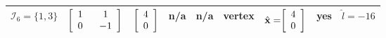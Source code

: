 \documentclass{imaman}
\newcommand{\bfx}{{\bf x}}
\newcommand{\calI}{{\mathcal I}}
\numberwithin{equation}{section}
\begin{document}
\begin{landscape}
\begin{table}[htbp]
\begin{threeparttable}[tbhp]
\begin{tabular}{l l l l l l l l l}
$\calI_6=\{1,3\}$ & \hspace{-0.1cm}$\left[ \renewcommand{\arraystretch}{1} \begin{array}{cc} 1 & ~~1 \\ 0 & ~~{-1} \end{array}\right]$ & \hspace{-0.1cm}$\left[ \renewcommand{\arraystretch}{1} \begin{array}{c} 4 \\ 0 \end{array}\right]$ & \hspace{-0.05cm}n/a & n/a & vertex & $\hat\bfx=\hspace{-0.1cm}\left[ \renewcommand{\arraystretch}{1} \begin{array}{c} 4 \\ 0 \end{array}\right]$ & yes & $\hat l=-16$ \vspace{0.2cm} \\
\hline
\end{tabular}
\label{Table_Ex_QP_Nonsingular}
\end{threeparttable}
\end{table}
\end{landscape}
\end{document}
